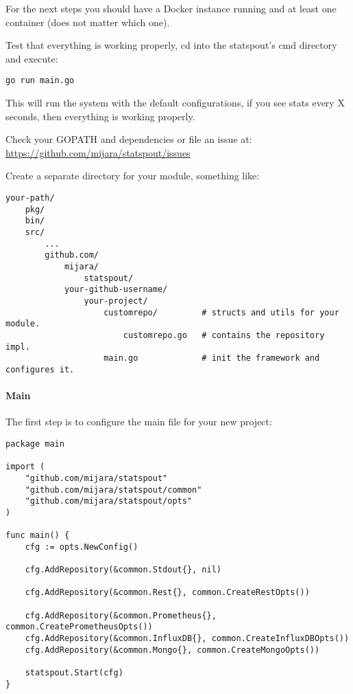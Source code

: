 For the next steps you should have a Docker instance running and at least one container (does not matter which one).

Test that everything is working properly, cd into the statspout's cmd directory and execute:

\begin{lstlisting}
go run main.go
\end{lstlisting}

This will run the system with the default configurations, if you see stats every X seconds, then everything is working properly.

\begin{story}
Check your GOPATH and dependencies or file an issue at: \url{https://github.com/mijara/statspout/issues}
\end{story}

Create a separate directory for your module, something like:

\begin{lstlisting}
your-path/
    pkg/
    bin/
    src/
        ...
        github.com/
            mijara/
                statspout/
            your-github-username/
                your-project/
                    customrepo/         # structs and utils for your module.
                        customrepo.go   # contains the repository impl.
                    main.go             # init the framework and configures it.
\end{lstlisting}

\paragraph{Main}

The first step is to configure the main file for your new project:

\begin{lstlisting}[language=Golang]
package main

import (
	"github.com/mijara/statspout"
	"github.com/mijara/statspout/common"
	"github.com/mijara/statspout/opts"
)

func main() {
	cfg := opts.NewConfig()

	cfg.AddRepository(&common.Stdout{}, nil)

	cfg.AddRepository(&common.Rest{}, common.CreateRestOpts())

	cfg.AddRepository(&common.Prometheus{}, common.CreatePrometheusOpts())
	cfg.AddRepository(&common.InfluxDB{}, common.CreateInfluxDBOpts())
	cfg.AddRepository(&common.Mongo{}, common.CreateMongoOpts())

	statspout.Start(cfg)
}
\end{lstlisting}

